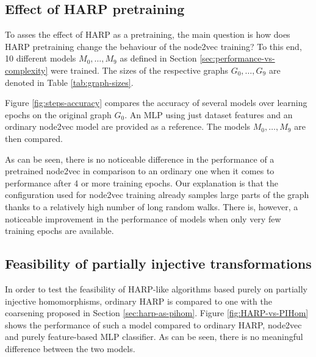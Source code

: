 \subsection{Effect of HARP pretraining}

To asses the effect of HARP as a pretraining, the main question is how does HARP pretraining change the behaviour of the node2vec training? To this end, 10 different models \( M_0, \dots, M_9 \) as defined in Section \ref{sec:performance-vs-complexity} were trained. The sizes of the respective graphs \( G_0, \dots, G_9 \) are denoted in Table \ref{tab:graph-sizes}.

Figure \ref{fig:steps-accuracy} compares the accuracy of several models over learning epochs on the original graph \( G_0 \). An MLP using just dataset features and an ordinary node2vec model are provided as a reference. The models \( M_0, \dots, M_9 \) are then compared.

As can be seen, there is no noticeable difference in the performance of a pretrained node2vec in comparison to an ordinary one when it comes to performance after 4 or more training epochs. Our explanation is that the configuration used for node2vec training already samples large parts of the graph thanks to a relatively high number of long random walks. There is, however, a noticeable improvement in the performance of models when only very few training epochs are available.

\subsection{Feasibility of partially injective transformations}\label{sec:harp-vs-pihom}

In order to test the feasibility of HARP-like algorithms based purely on partially injective homomorphisms, ordinary HARP is compared to one with the coarsening proposed in Section \ref{sec:harp-as-pihom}. Figure \ref{fig:HARP-vs-PIHom} shows the performance of such a model compared to ordinary HARP, node2vec and purely feature-based MLP classifier. As can be seen, there is no meaningful difference between the two models.
